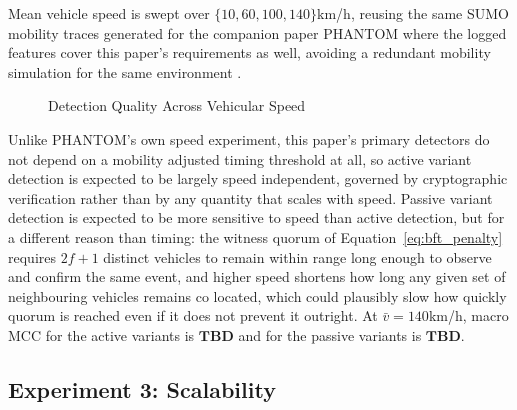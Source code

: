 \documentclass[final,5p,twocolumn]{elsarticle}
\theoremstyle{remark}
\theoremstyle{plain}
\newcommand{\TBD}{\textbf{TBD}} %
\begin{document}
Mean vehicle speed is swept over $\{10, 60, 100, 140\}$km/h, reusing the
same SUMO mobility traces generated for the companion paper PHANTOM where
the logged features cover this paper's requirements as well, avoiding a
redundant mobility simulation for the same environment \cite{Phantom2026}.
\begin{figure}[!t]
	\centering
	\caption{Detection Quality Across Vehicular Speed}
	\label{fig:exp2_speed}
\end{figure}
Unlike PHANTOM's own speed experiment, this paper's primary detectors do not
depend on a mobility adjusted timing threshold at all, so active variant
detection is expected to be largely speed independent, governed by
cryptographic verification rather than by any quantity that scales with
speed. Passive variant detection is expected to be more sensitive to speed
than active detection, but for a different reason than timing: the witness
quorum of Equation~\eqref{eq:bft_penalty} requires $2f{+}1$ distinct
vehicles to remain within range long enough to observe and confirm the same
event, and higher speed shortens how long any given set of neighbouring
vehicles remains co located, which could plausibly slow how quickly quorum
is reached even if it does not prevent it outright. At
$\bar{v}{=}140$km/h, macro MCC for the active variants is $\TBD$ and for
the passive variants is $\TBD$.

\subsection{Experiment 3: Scalability}
\end{document}
